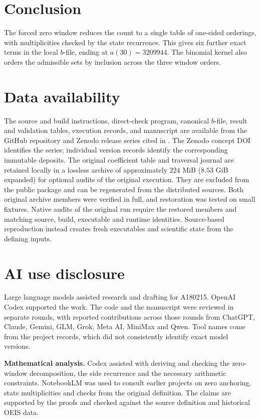 \documentclass[11pt]{article}
\begin{document}
\section{Conclusion}

The forced zero window reduces the count to a single table of one-sided
orderings, with multiplicities checked by the state recurrence.
This gives six further exact terms in the local \(b\)-file, ending at
\(a(30)=3209944\). The binomial kernel also orders the admissible sets
by inclusion across the three window orders.

\section*{Data availability}

The source and build instructions, direct-check program, canonical
\(b\)-file, result and validation tables, execution records, and manuscript
are available from the GitHub repository and Zenodo release series cited
in \cite{corti}. The Zenodo concept DOI identifies the series; individual
version records identify the corresponding immutable deposits.
The original coefficient table and traversal journal are retained locally
in a lossless archive of approximately \(224\) MiB
(\(8.53\) GiB expanded) for optional audits of the original execution.
They are excluded from the public package and can be regenerated from
the distributed sources. Both original archive members were verified in
full, and restoration was tested on small fixtures. Native audits of the
original run require the restored members and matching source, build,
executable and runtime identities. Source-based reproduction instead
creates fresh executables and scientific state from the defining inputs.

\section*{AI use disclosure}

Large language models assisted research and drafting for A180215.
OpenAI Codex supported the work. The code and the manuscript were
reviewed in separate rounds, with reported contributions across those
rounds from ChatGPT, Claude, Gemini, GLM, Grok, Meta AI, MiniMax and Qwen.
Tool names come from the project records, which did not consistently
identify exact model versions.

\smallskip
\noindent\textbf{Mathematical analysis.}
Codex assisted with deriving and checking the zero-window decomposition,
the side recurrence and the necessary arithmetic constraints.
NotebookLM was used to consult earlier projects on zero anchoring,
state multiplicities and checks from the original definition.
The claims are supported by the proofs and checked against the source
definition and historical OEIS data.
\end{document}
